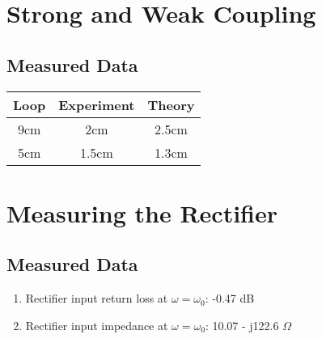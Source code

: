 \documentclass{article}
\begin{document}
\section{Strong and Weak Coupling}

\subsection{Measured Data}
\begin{table}[H]
\centering
\begin{tabular}{|c|c|c|}
\hline
Loop & Experiment & Theory \\ \hline
9cm & 2cm & 2.5cm\\ \hline
5cm & 1.5cm & 1.3cm\\ \hline
\end{tabular}
\end{table}

\section{Measuring the Rectifier}

\subsection{Measured Data}

\begin{enumerate}
	\item Rectifier input return loss at $\omega = \omega_0$: -0.47 dB
	\item Rectifier input impedance at $\omega = \omega_0$: 10.07 - j122.6 $\Omega$
\end{enumerate}
\end{document}
